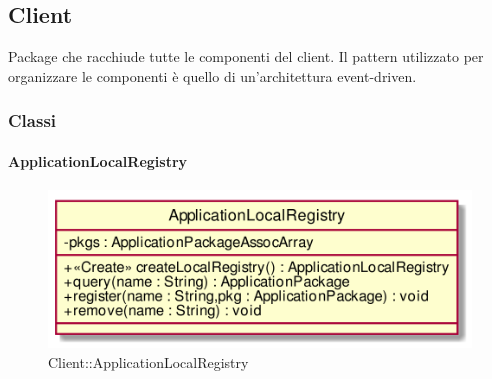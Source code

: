 \FloatBarrier

\subsection{Client}
Package che racchiude tutte le componenti del client. Il pattern utilizzato per organizzare le componenti è quello di un'architettura event-driven.
\subsubsection{Classi}
\hypertarget{ApplicationLocalRegistry_label}{\paragraph{ApplicationLocalRegistry}}
\begin{figure}[h]
	\centering
	\includegraphics[width=\textwidth,height=\textheight,keepaspectratio]{images/ClassApplicationLocalRegistry.png}
	\caption{Client::ApplicationLocalRegistry}
\end{figure}
